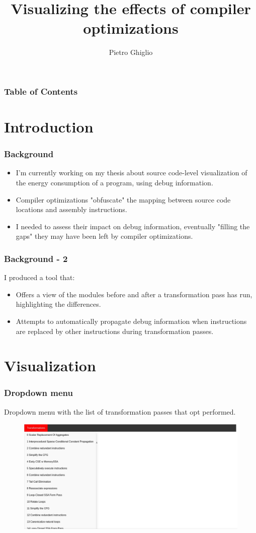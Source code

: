 \documentclass{beamer}
\title{Visualizing the effects of compiler optimizations}
\author{Pietro Ghiglio}
\begin{document}
\titlepage

\begin{frame}
\frametitle{Table of Contents}
\tableofcontents
\end{frame}

\section{Introduction}

\begin{frame}
\frametitle{Background}
\begin{itemize}
\item I'm currently working on my thesis about source code-level visualization of the energy consumption of a program, using debug information. 
\item Compiler optimizations "obfuscate" the mapping between source code locations and assembly instructions. 
\item I needed to assess their impact on debug information, eventually "filling the gaps" they may have been left by compiler optimizations. 
\end{itemize}
\end{frame}

\begin{frame}
\frametitle{Background - 2}
I produced a tool that:
\begin{itemize}
\item Offers a view of the modules before and after a transformation pass has run, highlighting the differences.
\item Attempts to automatically propagate debug information when instructions are replaced by other instructions during transformation passes.
\end{itemize}
\end{frame}

\section{Visualization}

\begin{frame}
\frametitle{Dropdown menu}
Dropdown menu with the list of transformation passes that opt performed.
\begin{figure}[b]
\includegraphics[scale=0.2]{dropdown.jpg}
\end{figure}
\end{frame}
\end{document}

